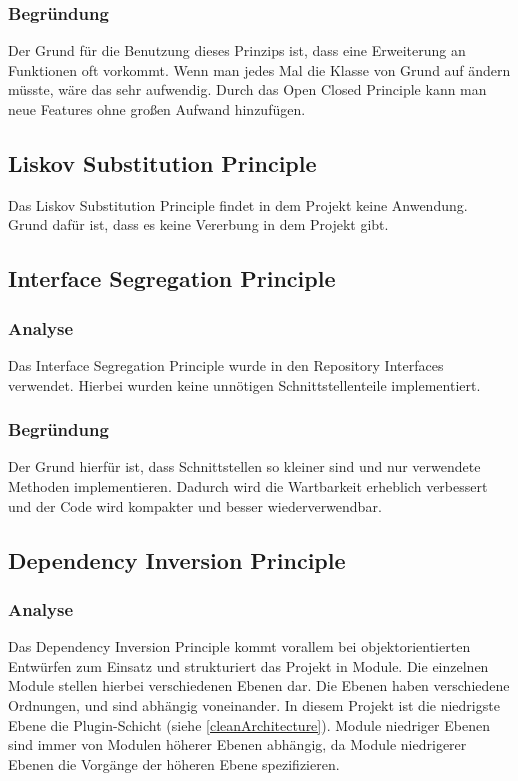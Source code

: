         \subsubsection{Begründung}
        Der Grund für die Benutzung dieses Prinzips ist, dass eine Erweiterung an Funktionen oft vorkommt. Wenn man jedes Mal die Klasse von Grund auf ändern müsste, wäre das sehr aufwendig. Durch das Open Closed Principle kann man neue Features ohne großen Aufwand hinzufügen.

    \subsection{Liskov Substitution Principle}
    
        Das Liskov Substitution Principle findet in dem Projekt keine Anwendung. Grund dafür ist, dass es keine Vererbung in dem Projekt gibt.

    \subsection{Interface Segregation Principle}
    
        \subsubsection{Analyse}
        Das Interface Segregation Principle wurde in den Repository Interfaces verwendet. Hierbei wurden keine unnötigen Schnittstellenteile implementiert.
        
        \subsubsection{Begründung}
        Der Grund hierfür ist, dass Schnittstellen so kleiner sind und nur verwendete Methoden implementieren. Dadurch wird die Wartbarkeit erheblich verbessert und der Code wird kompakter und besser wiederverwendbar.

\subsection{Dependency Inversion Principle}

        \subsubsection{Analyse}
        Das Dependency Inversion Principle kommt vorallem bei objektorientierten Entwürfen zum Einsatz und strukturiert das Projekt in Module. Die einzelnen Module stellen hierbei verschiedenen Ebenen dar. Die Ebenen haben verschiedene Ordnungen, und sind abhängig voneinander. In diesem Projekt ist die niedrigste Ebene die Plugin-Schicht (siehe \cref{cleanArchitecture}). Module niedriger Ebenen sind immer von Modulen höherer Ebenen abhängig, da Module niedrigerer Ebenen die Vorgänge der höheren Ebene spezifizieren.
        
